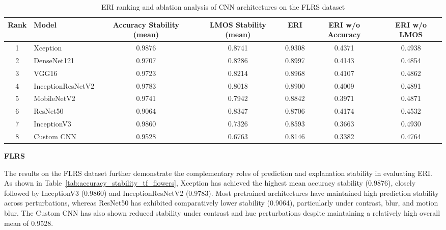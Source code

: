 \documentclass[a4paper,fleqn]{cas-dc}
\begin{document}
\begin{table}[t]
\centering
\caption{ERI ranking and ablation analysis of CNN architectures on the FLRS dataset}
\label{tab:eri_ablation_ranking_tf_flowers}

\scriptsize
\setlength{\tabcolsep}{5pt}
\renewcommand{\arraystretch}{1.15}

\begin{tabular}{|c|l|c|c|c|c|c|}
\hline
\textbf{Rank} &
\textbf{Model} &
\textbf{Accuracy Stability (mean)} &
\textbf{LMOS Stability (mean)} &
\textbf{ERI} &
\textbf{ERI w/o Accuracy} &
\textbf{ERI w/o LMOS} \\
\hline

1 & Xception
&0.9876&0.8741&0.9308&0.4371&0.4938\\

2 & DenseNet121
&0.9707&0.8286&0.8997&0.4143&0.4854\\

3 & VGG16
&0.9723&0.8214&0.8968&0.4107&0.4862\\

4 & InceptionResNetV2
&0.9783&0.8018&0.8900&0.4009&0.4891\\

5 & MobileNetV2
&0.9741&0.7942&0.8842&0.3971&0.4871\\

6 & ResNet50
&0.9064&0.8347&0.8706&0.4174&0.4532\\

7 & InceptionV3
&0.9860&0.7326&0.8593&0.3663&0.4930\\

8 & Custom CNN
&0.9528&0.6763&0.8146&0.3382&0.4764\\

\hline
\end{tabular}
\end{table}


\noindent\textbf{FLRS}

The results on the FLRS dataset further demonstrate the complementary roles of prediction and explanation stability in evaluating ERI. As shown in Table~\ref{tab:accuracy_stability_tf_flowers}, Xception has achieved the highest mean accuracy stability (0.9876), closely followed by InceptionV3 (0.9860) and InceptionResNetV2 (0.9783). Most pretrained architectures have maintained high prediction stability across perturbations, whereas ResNet50 has exhibited comparatively lower stability (0.9064), particularly under contrast, blur, and motion blur. The Custom CNN has also shown reduced stability under contrast and hue perturbations despite maintaining a relatively high overall mean of 0.9528.
\end{document}
